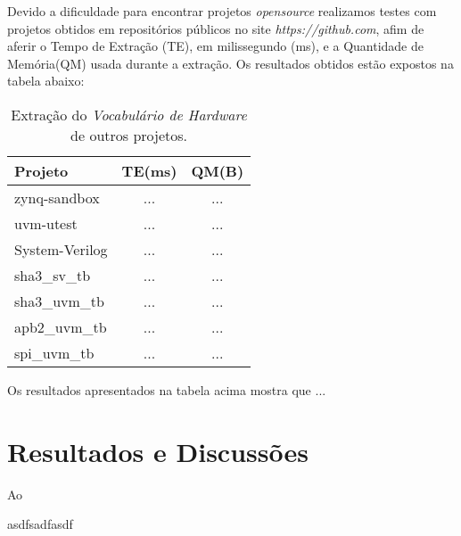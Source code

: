 \documentclass[12pt, twocolumn, a4paper]{article}
\begin{document}
Devido a dificuldade para encontrar projetos \textit{opensource} realizamos testes com projetos obtidos em repositórios públicos no site \textit{https://github.com}, afim de aferir o Tempo de Extração (TE), em milissegundo (ms), e a Quantidade de Memória(QM) usada durante a extração. Os resultados obtidos estão expostos na tabela abaixo:
	
	\begin{table}[h]
\centering
\caption{Extração do \textit{Vocabulário de Hardware} de outros projetos.}
	\begin{tabular}{l|c|c}
	\hline
	Projeto  & TE(ms) & QM(B)\\
	\hline
	zynq-sandbox     & ... & ...\\
	\hline
	uvm-utest 	   & ... & ...\\
	\hline
	System-Verilog   & ... & ...\\
	\hline
	sha3\_sv\_tb       & ... & ...\\
	\hline
	sha3\_uvm\_tb     & ... & ...\\
	\hline
	apb2\_uvm\_tb   & ... & ...\\
	\hline
	spi\_uvm\_tb       & ... & ...\\
	\hline
	
	\end{tabular}

\end{table}	
	
	
Os resultados apresentados na tabela acima mostra que ...
	
	
	\section{Resultados e Discussões}
	
Ao 



asdfsadfasdf

  
	
	
	
\end{document}
